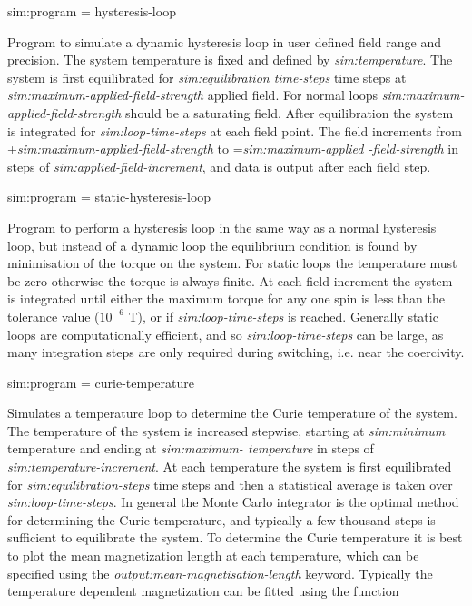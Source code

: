 {\zicf sim:program = hysteresis-loop} Program to simulate a dynamic hysteresis loop in user defined field range and precision. The system temperature is fixed and defined by \textit{sim:temperature}. The system is first equilibrated for \textit{sim:equilibration time-steps} time steps at \textit{sim:maximum-applied-field-strength} applied field. For normal loops \textit{sim:maximum-applied-field-strength} should be a saturating field. After equilibration the system is integrated for \textit{sim:loop-time-steps} at each field point. The field increments from +\textit{sim:maximum-applied-field-strength} to =\textit{sim:maximum-applied -field-strength} in steps of \textit{sim:applied-field-increment}, and data is output after each field step.

{\zicf sim:program = static-hysteresis-loop} Program to perform a hysteresis loop in the same way as a normal hysteresis loop, but instead of a dynamic loop the equilibrium condition is found by minimisation of the torque on the system. For static loops the temperature must be zero otherwise the torque is always finite. At each field increment the system is integrated until either the maximum torque for any one spin is less than the tolerance value ($10^{-6}$ T), or if \textit{sim:loop-time-steps} is reached. Generally static loops are computationally efficient, and so \textit{sim:loop-time-steps} can be large, as many integration steps are only required during switching, i.e. near the coercivity.

{\zicf sim:program = curie-temperature} Simulates a temperature loop to determine the Curie temperature of the system. The temperature of the system is increased stepwise, starting at \textit{sim:minimum} temperature and ending at \textit{sim:maximum- temperature} in steps of \textit{sim:temperature-increment}. At each temperature the system is first equilibrated for \textit{sim:equilibration-steps} time steps and then a statistical average is taken over \textit{sim:loop-time-steps}. In general the Monte Carlo integrator is the optimal method for determining the Curie temperature, and typically a few thousand steps is sufficient to equilibrate the system. To determine the Curie temperature it is best to plot the mean magnetization length at each temperature, which can be specified using the \textit{output:mean-magnetisation-length} keyword. Typically the temperature dependent magnetization can be fitted using the function

